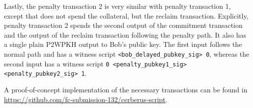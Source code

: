 \documentclass[twocolumn,showpacs,%
  nofootinbib,aps,superscriptaddress,%
  eqsecnum,prd,notitlepage,showkeys,10pt]{revtex4-1}
\begin{document}
Lastly, the penalty transaction 2 is very similar with penalty transaction 1, except that does not spend the collateral, but the reclaim transaction. Explicitly, penalty transaction 2 spends the second output of the commitment transaction and the output of the reclaim transaction following the penalty path. It also has a single plain P2WPKH output to Bob's public key. The first input follows the normal path and has a witness script \texttt{<bob\_delayed\_pubkey\_sig> 0}, whereas the second input has a witness script \texttt{0 <penalty\_pubkey1\_sig> <penalty\_pubkey2\_sig> 1}.

A proof-of-concept implementation of the necessary transactions can be found in
\url{https://github.com/fc-submission-132/cerberus-script}.
 \fi
\end{document}
